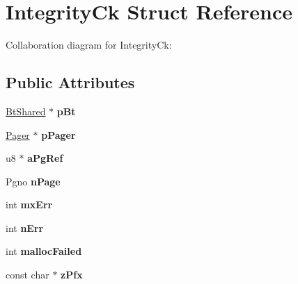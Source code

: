 \hypertarget{struct_integrity_ck}{\section{Integrity\+Ck Struct Reference}
\label{struct_integrity_ck}
}


Collaboration diagram for Integrity\+Ck\+:
\subsection*{Public Attributes}
\begin{DoxyCompactItemize}
\item 
\hypertarget{struct_integrity_ck_a65f03f54514f504bd871bb2ccd3da188}{\hyperlink{struct_bt_shared}{Bt\+Shared} $\ast$ {\bfseries p\+Bt}}\label{struct_integrity_ck_a65f03f54514f504bd871bb2ccd3da188}

\item 
\hypertarget{struct_integrity_ck_a87e7f8b012b61b61fae359269cbacce4}{\hyperlink{struct_pager}{Pager} $\ast$ {\bfseries p\+Pager}}\label{struct_integrity_ck_a87e7f8b012b61b61fae359269cbacce4}

\item 
\hypertarget{struct_integrity_ck_a317f80aef5842ad69df75b55e14118d1}{u8 $\ast$ {\bfseries a\+Pg\+Ref}}\label{struct_integrity_ck_a317f80aef5842ad69df75b55e14118d1}

\item 
\hypertarget{struct_integrity_ck_a04f496ef7239aea6dccb6a861bb5a798}{Pgno {\bfseries n\+Page}}\label{struct_integrity_ck_a04f496ef7239aea6dccb6a861bb5a798}

\item 
\hypertarget{struct_integrity_ck_a9daa97cdcb1366c503451ab2af9e7ba6}{int {\bfseries mx\+Err}}\label{struct_integrity_ck_a9daa97cdcb1366c503451ab2af9e7ba6}

\item 
\hypertarget{struct_integrity_ck_a52c815a1d19be87d0ab4dc0a4e4d38e2}{int {\bfseries n\+Err}}\label{struct_integrity_ck_a52c815a1d19be87d0ab4dc0a4e4d38e2}

\item 
\hypertarget{struct_integrity_ck_a8e448c1d6483a0326a7ec39291782030}{int {\bfseries malloc\+Failed}}\label{struct_integrity_ck_a8e448c1d6483a0326a7ec39291782030}

\item 
\hypertarget{struct_integrity_ck_a126e42d437777815b1c1d74bcacb3b38}{const char $\ast$ {\bfseries z\+Pfx}}\label{struct_integrity_ck_a126e42d437777815b1c1d74bcacb3b38}


\end{DoxyCompactItemize}
